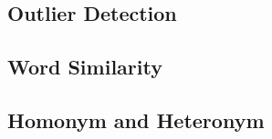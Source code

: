\subsection{Outlier Detection} \label{sec:analysis_outlier}


            
            
    
    


\subsection{Word Similarity} \label{sec:analysis_similarity}


\subsection{Homonym and Heteronym} \label{sec:analysis_homonym_heteronym}

